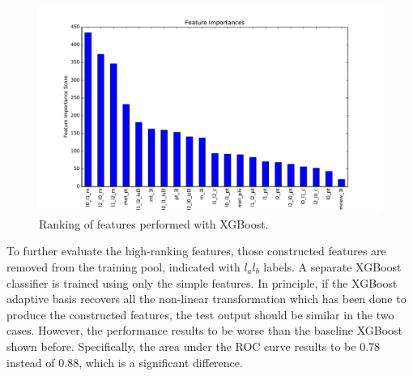 \documentclass{article}
\begin{document}
\begin{figure}[!h]
  \label{fig:feature_ranking}
  \centering
  \includegraphics[width=\columnwidth]{feature_ranking_highlevel.pdf}
  \caption{Ranking of features performed with XGBoost.}
\end{figure}

To further evaluate the high-ranking features, those constructed features are removed from the training pool, indicated with $l_{a} l_{b}$ labels. A separate XGBoost classifier is trained using only the simple features. In principle, if the XGBoost adaptive basis recovers all the non-linear transformation which has been done to produce the constructed features, the test output should be similar in the two cases. 
However, the performance results to be worse than the baseline XGBoost shown before. Specifically, the area under the ROC curve results to be 0.78 instead of 0.88, which is a significant difference.
\end{document}
